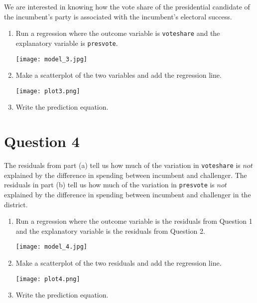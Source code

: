 \documentclass[12pt,letterpaper]{article}
\begin{document}
\noindent We are interested in knowing how the vote share of the presidential candidate of the incumbent's party is associated with the incumbent's electoral success.
	\vspace{.25cm}
	\begin{enumerate}
		\item Run a regression where the outcome variable is \texttt{voteshare} and the explanatory variable is \texttt{presvote}.
					 
		\texttt{[image: model\_3.jpg]}
			\vspace{5cm}
		\item Make a scatterplot of the two variables and add the regression line. 
			\vspace{.5cm}
		
		 
		\centering
		\texttt{[image: plot3.png]}
			\vspace{.5cm}
		\item Write the prediction equation.
			 
	\end{enumerate}
	

\newpage	
\section*{Question 4}
\noindent The residuals from part (a) tell us how much of the variation in \texttt{voteshare} is $not$ explained by the difference in spending between incumbent and challenger. The residuals in part (b) tell us how much of the variation in \texttt{presvote} is $not$ explained by the difference in spending between incumbent and challenger in the district.
	\begin{enumerate}
		\item Run a regression where the outcome variable is the residuals from Question 1 and the explanatory variable is the residuals from Question 2.	
			 
			\texttt{[image: model\_4.jpg]}
		\vspace{6cm}
		\item Make a scatterplot of the two residuals and add the regression line. 	
			 
		\centering
		\texttt{[image: plot4.png]}
		\vspace{2cm}
		\item Write the prediction equation.
			 
	\end{enumerate}
	
\end{document}
